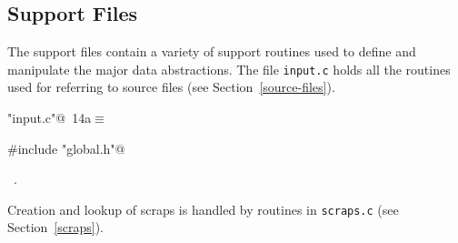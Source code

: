 \documentclass[a4paper]{report}
\begin{document}
\subsection{Support Files}

The support files contain a variety of support routines used to define
and manipulate the major data abstractions.
The file \verb|input.c| holds all the routines used for referring to
source files (see Section~\ref{source-files}).
\begin{flushleft} \small
\begin{minipage}{\linewidth}\label{scrap10}\raggedright\small
{} \verb@"input.c"@\nobreak\ {\footnotesize {14a}}$\equiv$
\vspace{-1ex}
\begin{list}{}{} \item
\mbox{}\verb@#include "global.h"@\\
\mbox{}\verb@@{\NWsep}
\end{list}
\vspace{-1.5ex}
\footnotesize
\begin{list}{}{\setlength{\itemsep}{-\parsep}\setlength{\itemindent}{-\leftmargin}}
\item \NWtxtFileDefBy\ .

\item{}
\end{list}
\end{minipage}\vspace{4ex}
\end{flushleft}
Creation and lookup of scraps is handled by routines in \verb|scraps.c|
(see Section~\ref{scraps}).
\end{document}

